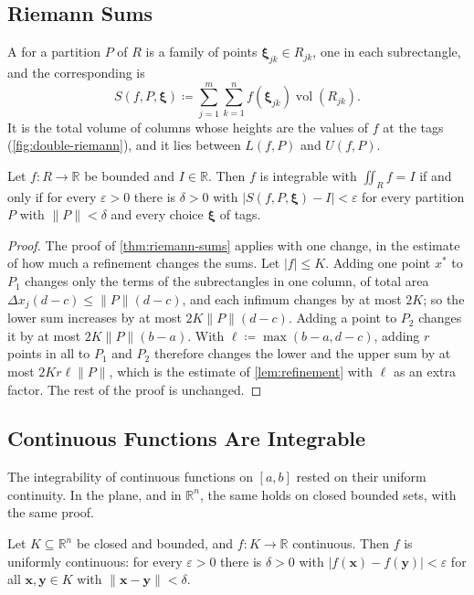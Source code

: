 \subsection{Riemann Sums}

A  for a partition $P$ of $R$ is a family of points $\boldsymbol\xi_{jk}\in R_{jk}$, one in each subrectangle, and the corresponding  is
\[
S(f,P,\boldsymbol\xi)\coloneqq\sum_{j=1}^m\sum_{k=1}^nf(\boldsymbol\xi_{jk})\operatorname{vol}(R_{jk}) .
\]
It is the total volume of columns whose heights are the values of $f$ at the tags (\cref{fig:double-riemann}), and it lies between $L(f,P)$ and $U(f,P)$.

\begin{theorem}
\label{thm:riemann-sums-2d}
Let $f\colon R\to\mathbb R$ be bounded and $I\in\mathbb R$. Then $f$ is integrable with $\iint_Rf=I$ if and only if for every $\varepsilon>0$ there is $\delta>0$ with $|S(f,P,\boldsymbol\xi)-I|<\varepsilon$ for every partition $P$ with $\|P\|<\delta$ and every choice $\boldsymbol\xi$ of tags.
\end{theorem}

\begin{proof}
The proof of \cref{thm:riemann-sums} applies with one change, in the estimate of how much a refinement changes the sums. Let $|f|\le K$. Adding one point $x^*$ to $P_1$ changes only the terms of the subrectangles in one column, of total area $\Delta x_j(d-c)\le\|P\|(d-c)$, and each infimum changes by at most $2K$; so the lower sum increases by at most $2K\|P\|(d-c)$. Adding a point to $P_2$ changes it by at most $2K\|P\|(b-a)$. With $\ell\coloneqq\max(b-a,d-c)$, adding $r$ points in all to $P_1$ and $P_2$ therefore changes the lower and the upper sum by at most $2Kr\ell\|P\|$, which is the estimate of \cref{lem:refinement} with $\ell$ as an extra factor. The rest of the proof is unchanged.
\end{proof}

\subsection{Continuous Functions Are Integrable}

The integrability of continuous functions on $[a,b]$ rested on their uniform continuity. In the plane, and in $\mathbb R^n$, the same holds on closed bounded sets, with the same proof.

\begin{lemma}
\label{lem:heine-cantor-rn}
Let $K\subseteq\mathbb R^n$ be closed and bounded, and $f\colon K\to\mathbb R$ continuous. Then $f$ is uniformly continuous: for every $\varepsilon>0$ there is $\delta>0$ with $|f(\mathbf x)-f(\mathbf y)|<\varepsilon$ for all $\mathbf x,\mathbf y\in K$ with $\|\mathbf x-\mathbf y\|<\delta$.
\end{lemma}

